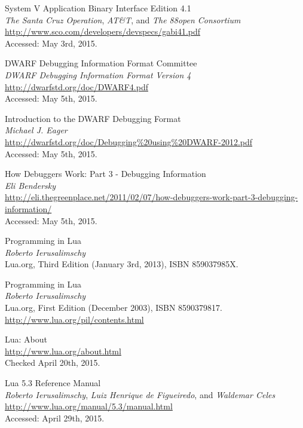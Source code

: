 
\begin{thebibliography}{99}

		System V Application Binary Interface Edition 4.1 \\
		\emph{The Santa Cruz Operation}, \emph{AT\&T}, and \emph{The 88open Consortium} \\
		\url{http://www.sco.com/developers/devspecs/gabi41.pdf} \\
		Accessed: May 3rd, 2015.

		DWARF Debugging Information Format Committee \\
		\emph{DWARF Debugging Information Format Version 4} \\
		\url{http://dwarfstd.org/doc/DWARF4.pdf} \\
		Accessed: May 5th, 2015.

		Introduction to the DWARF Debugging Format \\
		\emph{Michael J. Eager} \\
		\url{http://dwarfstd.org/doc/Debugging\%20using\%20DWARF-2012.pdf} \\
		Accessed: May 5th, 2015.

		How Debuggers Work: Part 3 - Debugging Information \\
		\emph{Eli Bendersky} \\
		\url{http://eli.thegreenplace.net/2011/02/07/how-debuggers-work-part-3-debugging-information/} \\
		Accessed: May 5th, 2015.

		Programming in Lua \\
		\emph{Roberto Ierusalimschy} \\
		Lua.org, Third Edition (January 3rd, 2013), ISBN 859037985X.

		Programming in Lua \\
		\emph{Roberto Ierusalimschy} \\
		Lua.org, First Edition (December 2003), ISBN 8590379817. \\
		\url{http://www.lua.org/pil/contents.html}

		Lua: About \\
		\url{http://www.lua.org/about.html} \\
		Checked April 20th, 2015.

		Lua 5.3 Reference Manual \\
		\emph{Roberto Ierusalimschy}, \emph{Luiz Henrique de Figueiredo}, and
		\emph{Waldemar Celes} \\
		\url{http://www.lua.org/manual/5.3/manual.html} \\
		Accessed: April 29th, 2015.


\end{thebibliography}
